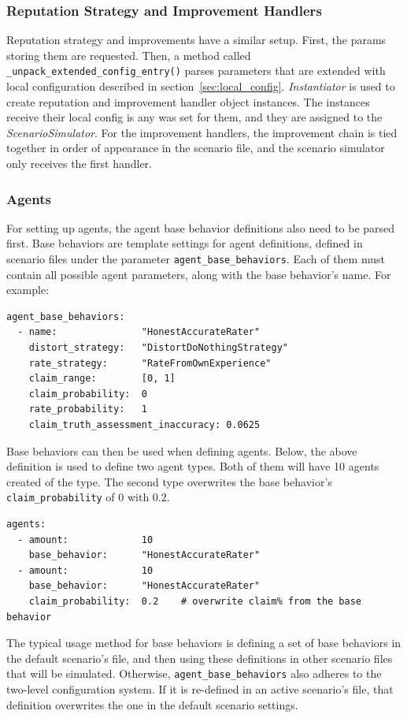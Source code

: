 \documentclass[%
    ]{\PathToTumTemplate/thesis/tum_thesis}
\begin{document}
\subsubsection{Reputation Strategy and Improvement Handlers}
Reputation strategy and improvements have a similar setup.
First, the params storing them are requested.
Then, a method called \lstinline{_unpack_extended_config_entry()} parses parameters that are extended with local configuration described in section~\ref{sec:local_config}.
\emph{Instantiator} is used to create reputation and improvement handler object instances.
The instances receive their local config is any was set for them, and they are assigned to the \emph{ScenarioSimulator}.
For the improvement handlers, the improvement chain is tied together in order of appearance in the scenario file, and the scenario simulator only receives the first handler.

\subsubsection{Agents}
For setting up agents, the agent base behavior definitions also need to be parsed first.
Base behaviors are template settings for agent definitions, defined in scenario files under the parameter \lstinline{agent_base_behaviors}.
Each of them must contain all possible agent parameters, along with the base behavior's name.
For example:
\begin{lstlisting}
agent_base_behaviors:
  - name: 				"HonestAccurateRater"
    distort_strategy: 	"DistortDoNothingStrategy"
    rate_strategy: 		"RateFromOwnExperience"
    claim_range: 		[0, 1]
    claim_probability: 	0
    rate_probability: 	1
    claim_truth_assessment_inaccuracy: 0.0625
\end{lstlisting}
Base behaviors can then be used when defining agents. Below, the above definition is used to define two agent types. Both of them will have 10 agents created of the type. The second type overwrites the base behavior's \lstinline{claim_probability} of 0 with 0.2.
\begin{lstlisting}
agents:
  - amount: 			10
  	base_behavior: 		"HonestAccurateRater"
  - amount: 			10
  	base_behavior: 		"HonestAccurateRater"
  	claim_probability: 	0.2    # overwrite claim% from the base behavior
\end{lstlisting}
The typical usage method for base behaviors is defining a set of base behaviors in the default scenario's file, and then using these definitions in other scenario files that will be simulated.
Otherwise, \lstinline{agent_base_behaviors} also adheres to the two-level configuration system.
If it is re-defined in an active scenario's file, that definition overwrites the one in the default scenario settings.
\end{document}
